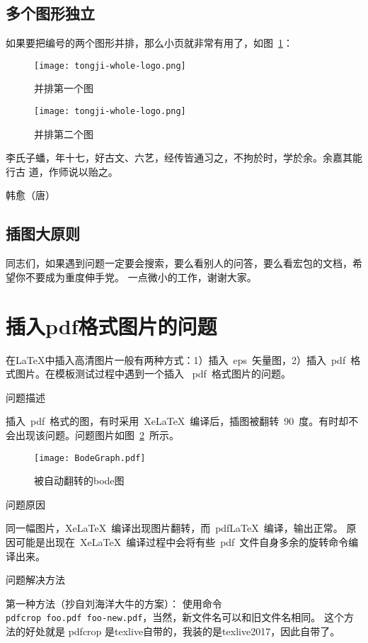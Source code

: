 \subsection{多个图形独立}
如果要把编号的两个图形并排，那么小页就非常有用了，如图~\ref{fig:parallel2}：
\begin{figure}
\begin{minipage}{0.48\textwidth}
  \centering
  \texttt{[image: tongji-whole-logo.png]}
  \caption{并排第一个图}
  \label{fig:parallel1}
\end{minipage}\hfill
\begin{minipage}{0.48\textwidth}
  \centering
  \texttt{[image: tongji-whole-logo.png]}
  \caption{并排第二个图}
  \label{fig:parallel2}
\end{minipage}
\end{figure}


李氏子蟠，年十七，好古文、六艺，经传皆通习之，不拘於时，学於余。余嘉其能行古
道，作师说以贻之。

\hfill \pozhehao 韩愈（唐）


\subsection{插图大原则}
同志们，如果遇到问题一定要会搜索，要么看别人的问答，要么看宏包的文档，希望你不要成为重度伸手党。
一点微小的工作，谢谢大家。

\section{插入pdf格式图片的问题}
\label{sec:problem}
在\LaTeX{}中插入高清图片一般有两种方式：1）插入~eps~矢量图，2）插入~pdf~格式图片。在模板测试过程中遇到一个插入
~pdf~格式图片的问题。

问题描述

插入~pdf~格式的图，有时采用~XeLaTeX~编译后，插图被翻转~90~度。有时却不会出现该问题。问题图片如图~\ref{rotatedBode}~所示。
\begin{figure}[H] 
  \centering
  \texttt{[image: BodeGraph.pdf]}
  \caption{被自动翻转的bode图}
  \label{rotatedBode}
\end{figure}

问题原因

同一幅图片，XeLaTeX~编译出现图片翻转，而~pdfLaTeX~编译，输出正常。
原因可能是出现在~XeLaTeX~编译过程中会将有些~pdf~文件自身多余的旋转命令编译出来。

问题解决方法

第一种方法（抄自刘海洋大牛的方案）：
使用命令\\ \texttt{pdfcrop foo.pdf foo-new.pdf}，当然，新文件名可以和旧文件名相同。 这个方法的好处就是 pdfcrop 是texlive自带的，我装的是texlive2017，因此自带了。

